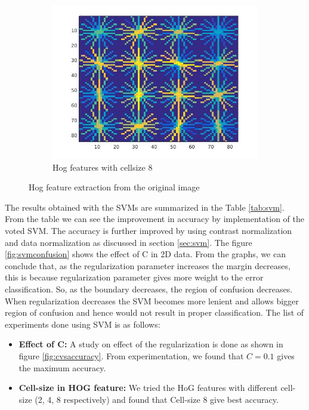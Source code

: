 \documentclass{article} %
\begin{document}
\begin{figure}
\begin{subfigure}{0.33\textwidth}
\includegraphics[scale=0.25]{images/hog_cellsize_8}
\caption{Hog features with cellsize 8}
\end{subfigure}
\caption{Hog feature extraction from the original image}
\end{figure}


        The results obtained with the SVMs are summarized in the Table \ref{tab:svm}. From the table we can see the improvement in accuracy by implementation of the voted SVM. The accuracy is further improved by using contrast normalization and data normalization as discussed in section \ref{sec:svm}. 
        The figure \ref{fig:svmconfusion} shows the effect of C in 2D data. From the graphs, we can conclude that, as the regularization parameter increases the margin decreases, this is because regularization parameter gives more weight to the error classification. So, as the boundary decreases, the region of confusion decreases. When regularization decreases  the SVM becomes more lenient and allows bigger region of confusion and hence would not result in proper classification.
        The list of experiments done using SVM is as follows:
\begin{itemize}
\item \textbf{Effect of C:} A study on effect of the regularization is done as shown in figure \ref{fig:cvsaccuracy}. From experimentation, we found that $C=0.1$ gives the maximum accuracy.
\item \textbf{Cell-size in HOG feature:} We tried the HoG features with different cell-size (2, 4, 8 respectively) and found that Cell-size 8 give best accuracy.
\end{itemize}
\end{document}
